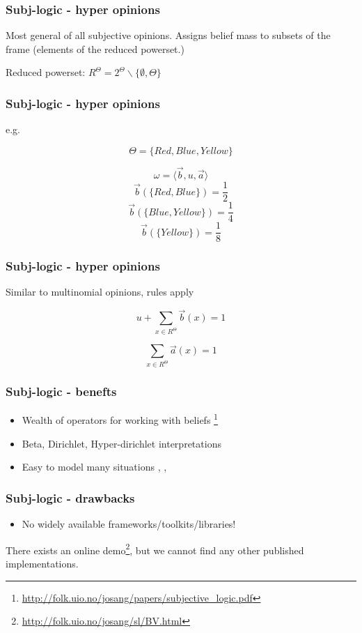 \documentclass{beamer}
\begin{document}
\begin{frame}
\frametitle{Subj-logic - hyper opinions}

Most general of all subjective opinions. Assigns belief mass to subsets of the
frame (elements of the reduced powerset.)

Reduced powerset: $R^\Theta = 2^\Theta \backslash \lbrace \emptyset, \Theta \rbrace$

\end{frame}

\begin{frame}
\frametitle{Subj-logic - hyper opinions}

e.g.

$$\Theta = \lbrace Red, Blue, Yellow \rbrace$$

$$\omega = \langle \vec{b}, u, \vec{a} \rangle$$
$$\vec{b}\left(\lbrace Red, Blue \rbrace \right) = \frac{1}{2}$$
$$\vec{b}\left(\lbrace Blue, Yellow \rbrace \right) = \frac{1}{4}$$
$$\vec{b}\left(\lbrace Yellow \rbrace \right) = \frac{1}{8}$$

\end{frame}

\begin{frame}
\frametitle{Subj-logic - hyper opinions}

Similar to multinomial opinions, rules apply

$$u + \sum_{x \in R^\Theta} \vec{b}\left(x\right) = 1$$

$$\sum_{x \in R^\Theta} \vec{a}\left(x\right) = 1$$

\end{frame}

\begin{frame}
\frametitle{Subj-logic - benefts}

\begin{itemize}
  \item Wealth of operators for working with beliefs
     \footnote{\url{http://folk.uio.no/josang/papers/subjective_logic.pdf}}
  \item Beta, Dirichlet, Hyper-dirichlet interpretations
  \item Easy to model many situations
    \cite{josang2008conditional}, \cite{josang2006trust}, \cite{kent2010application}
\end{itemize}

\end{frame}

\begin{frame}
\frametitle{Subj-logic - drawbacks}

\begin{itemize}
  \item No widely available frameworks/toolkits/libraries!
\end{itemize}

There exists an online demo\footnote{\url{http://folk.uio.no/josang/sl/BV.html}},
but we cannot find any other published implementations.

\end{frame}
\end{document}
